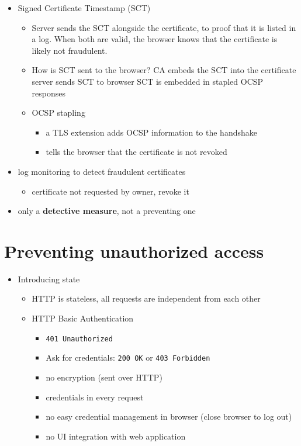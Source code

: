 \documentclass[12pt,titlepage,a4paper]{report}
\begin{document}
\begin{itemize}
\begin{itemize}
					\item Signed Certificate Timestamp (SCT)
					\begin{itemize}
						\item Server sends the SCT alongside the certificate, to proof that it is listed in a log. When both are valid, the browser knows that the certificate is likely not fraudulent.
						\item How is SCT sent to the browser?
							\subitem CA embeds the SCT into the certificate
							\subitem server sends SCT to browser
							\subitem SCT is embedded in stapled OCSP responses
						\item OCSP stapling
						\begin{itemize}
							\item a TLS extension adds OCSP information to the handshake
							\item tells the browser that the certificate is not revoked
						\end{itemize}
					\end{itemize}
					\item log monitoring to detect fraudulent certificates
					\begin{itemize}
						\item certificate not requested by owner, revoke it
					\end{itemize}
				\item only a \textbf{detective measure}, not a preventing one
				\end{itemize}
			\end{itemize}
		
		
		\section{Preventing unauthorized access}
			\begin{itemize}
				\item Introducing state
				\begin{itemize}
					\item HTTP is stateless, all requests are independent from each other
					\item HTTP Basic Authentication
					\begin{itemize}
						\item \texttt{401 Unauthorized}
						\item Ask for credentials: \texttt{200 OK} or \texttt{403 Forbidden}
						\item no encryption (sent over HTTP)
						\item credentials in every request
						\item no easy credential management in browser (close browser to log out)
						\item no UI integration with web application
					\end{itemize}
				\end{itemize}
			\end{itemize}
\end{document}
